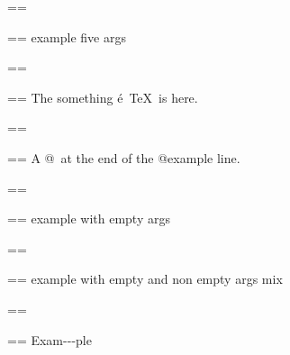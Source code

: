 \documentclass{book}
\makeatletter
\newenvironment{GNUTexinfopreformatted}{%
  \par\GNUTobeylines\obeyspaces\frenchspacing
  \parskip=\z@\parindent=\z@}{}
{\catcode`\^^M=13 \gdef\GNUTobeylines{\catcode`\^^M=13 \def^^M{\null\par}}}
\newenvironment{GNUTexinfoindented}
  {\begin{list}{}{}
  \item\relax}
  {\end{list}}
\makeatother
\begin{document}
\begin{GNUTexinfoindented}
\begin{GNUTexinfopreformatted}%
\ttfamily 
\end{GNUTexinfopreformatted}
\begin{GNUTexinfoindented}
\begin{GNUTexinfopreformatted}%
\ttfamily example five args
\end{GNUTexinfopreformatted}
\end{GNUTexinfoindented}
\begin{GNUTexinfopreformatted}%
\ttfamily 
\end{GNUTexinfopreformatted}
\begin{GNUTexinfoindented}
\begin{GNUTexinfopreformatted}%
\ttfamily The something \'{e}\ \TeX{}\ is here.
\end{GNUTexinfopreformatted}
\end{GNUTexinfoindented}
\begin{GNUTexinfopreformatted}%
\ttfamily 
\end{GNUTexinfopreformatted}
\begin{GNUTexinfoindented}
\begin{GNUTexinfopreformatted}%
\ttfamily A @\ at the end of the @example line.
\end{GNUTexinfopreformatted}
\end{GNUTexinfoindented}
\begin{GNUTexinfopreformatted}%
\ttfamily 
\end{GNUTexinfopreformatted}
\begin{GNUTexinfoindented}
\begin{GNUTexinfopreformatted}%
\ttfamily example with empty args
\end{GNUTexinfopreformatted}
\end{GNUTexinfoindented}
\begin{GNUTexinfopreformatted}%
\ttfamily 
\end{GNUTexinfopreformatted}
\begin{GNUTexinfoindented}
\begin{GNUTexinfopreformatted}%
\ttfamily example with empty and non empty args mix
\end{GNUTexinfopreformatted}
\end{GNUTexinfoindented}
\begin{GNUTexinfopreformatted}%
\ttfamily 
\end{GNUTexinfopreformatted}
\begin{GNUTexinfoindented}
\begin{GNUTexinfopreformatted}%
\ttfamily Exam{-}{-}{-}ple


\end{GNUTexinfopreformatted}
\end{GNUTexinfoindented}
\end{GNUTexinfoindented}
\end{document}

